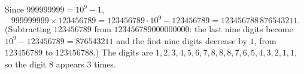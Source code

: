 Since $999999999=10^9-1$,
\[
999999999\times123456789=123456789\cdot10^9-123456789=123456788\,876543211 .
\]
(Subtracting $123456789$ from $123456789000000000$: the last nine digits become $10^9-123456789=876543211$ and the first nine digits decrease by $1$, from $123456789$ to $123456788$.) The digits are $1,2,3,4,5,6,7,8,8,8,7,6,5,4,3,2,1,1$, so the digit $8$ appears $\boxed{3}$ times.
